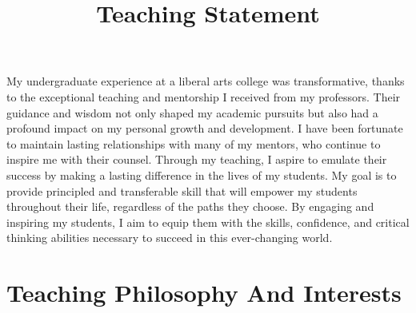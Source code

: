 \documentclass[11pt,a4paper,sans]{moderncv} %
\title{Teaching Statement}
\begin{document}
\makecvtitle %

\setlength\parskip{8px}

My undergraduate experience at a liberal arts college was transformative, thanks to the exceptional teaching and mentorship I received from my professors. 
Their guidance and wisdom not only shaped my academic pursuits but also had a profound impact on my personal growth and development. 
I have been fortunate to maintain lasting relationships with many of my mentors, who continue to inspire me with their counsel. 
Through my teaching, I aspire to emulate their success by making a lasting difference in the lives of my students. 
My goal is to provide principled and transferable skill that will empower my students throughout their life, regardless of the paths they choose. 
By engaging and inspiring my students, I aim to equip them with the skills, confidence, and critical thinking abilities necessary to succeed in this ever-changing world.

\section{Teaching Philosophy And Interests}
\end{document}
